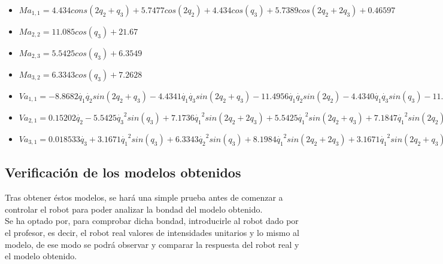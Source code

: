 \begin{itemize}
	\item $ Ma_{1,1}=4.434cons(2q_2 + q_3) + 5.7477cos(2q_2) + 4.434cos(q_3) + 5.7389cos(2q_2 + 2q_3) + 0.46597$ \\ \vspace{0.2cm}
	\item $ Ma_{2,2}= 11.085cos(q_3) + 21.67$ \\ \vspace{0.2cm}
	\item $ Ma_{2,3}=5.5425cos(q_3) + 6.3549$ \\ \vspace{0.2cm}
	\item $ Ma_{3,2}= 6.3343cos(q_3) + 7.2628 $ \\ \vspace{0.2cm}
	\item $ Va_{1,1}= -8.8682\dot{q_{1}}\dot{q_{2}}sin(2q_2 + q_3) - 4.4341\dot{q_{1}}\dot{q_{3}}sin(2q_2 + q_3) - 11.4956\dot{q_{1}}\dot{q_{2}}sin(2q_2)  - 4.4340\dot{q_{1}}\dot{q_{3}}sin(q_3) - 11.4779\dot{q_{1}}\dot{q_{2}}sin(2q_2 + 2q_3) - 11.4779\dot{q_{1}}\dot{q_{3}}sin(2q_2 + 2q_3) + 0.0363 $ \\ \vspace{0.2cm}
	 \item $ Va_{2,1}= 0.15202\dot{q_{2}} - 5.5425\dot{q_{3}}^2sin(q_3) + 7.1736\dot{q_{1}}^2sin(2q_2 + 2q_3) + 5.5425\dot{q_{1}}^2sin(2q_2 + q_3) + 7.1847\dot{q_{1}}^2sin(2q_2) - 11.085\dot{q_{2}}\dot{q_{3}}sin(q_3)$ \\ \vspace{0.2cm}
	 \item $ Va_{3,1}=  0.018533\dot{q_{3}} + 3.1671\dot{q_{1}}^{2}sin(q_3) + 6.3343\dot{q_{2}}^{2}sin(q_3) + 8.1984\dot{q_{1}}^{2}sin(2q_2 + 2q_3) + 3.1671\dot{q_{1}}^{2}sin(2q_2 + q_3)$
\end{itemize}


\newpage
\subsection{Verificación de los modelos obtenidos}
Tras obtener éstos modelos, se hará una simple prueba antes de comenzar a controlar el robot para poder analizar la bondad del modelo obtenido.\\
Se ha optado por, para comprobar dicha bondad, introducirle al robot dado por el profesor, es decir, el robot real valores de intensidades unitarios y lo
mismo al modelo, de ese modo se podrá observar y comparar la respuesta del robot real y el modelo obtenido.\\

